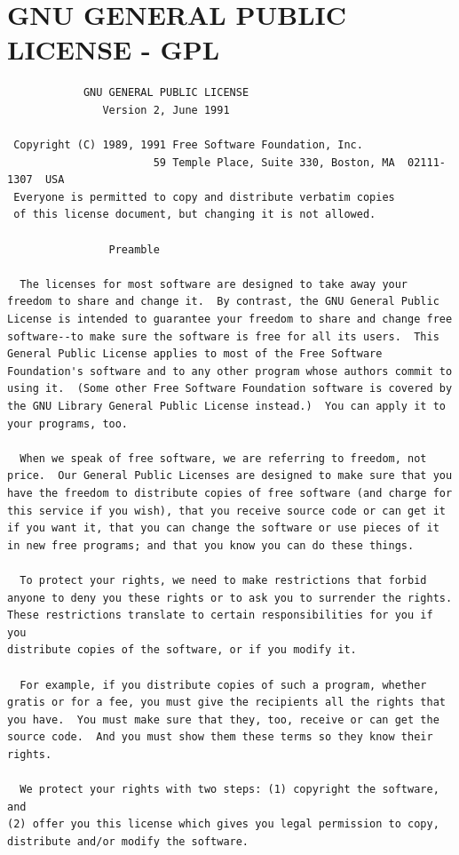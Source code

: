 \documentclass[a4paper,BCOR30mm,DIV14,pdftex,liststotoc,footsepline,openany]{scrbook}
\begin{document}
\chapter{GNU GENERAL PUBLIC LICENSE - GPL}
\begin{verbatim}
		    GNU GENERAL PUBLIC LICENSE
		       Version 2, June 1991

 Copyright (C) 1989, 1991 Free Software Foundation, Inc.
                       59 Temple Place, Suite 330, Boston, MA  02111-1307  USA
 Everyone is permitted to copy and distribute verbatim copies
 of this license document, but changing it is not allowed.

			    Preamble

  The licenses for most software are designed to take away your
freedom to share and change it.  By contrast, the GNU General Public
License is intended to guarantee your freedom to share and change free
software--to make sure the software is free for all its users.  This
General Public License applies to most of the Free Software
Foundation's software and to any other program whose authors commit to
using it.  (Some other Free Software Foundation software is covered by
the GNU Library General Public License instead.)  You can apply it to
your programs, too.

  When we speak of free software, we are referring to freedom, not
price.  Our General Public Licenses are designed to make sure that you
have the freedom to distribute copies of free software (and charge for
this service if you wish), that you receive source code or can get it
if you want it, that you can change the software or use pieces of it
in new free programs; and that you know you can do these things.

  To protect your rights, we need to make restrictions that forbid
anyone to deny you these rights or to ask you to surrender the rights.
These restrictions translate to certain responsibilities for you if you
distribute copies of the software, or if you modify it.

  For example, if you distribute copies of such a program, whether
gratis or for a fee, you must give the recipients all the rights that
you have.  You must make sure that they, too, receive or can get the
source code.  And you must show them these terms so they know their
rights.

  We protect your rights with two steps: (1) copyright the software, and
(2) offer you this license which gives you legal permission to copy,
distribute and/or modify the software.


\end{verbatim}
\end{document}
